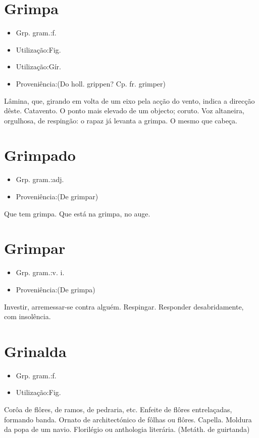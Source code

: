 \section{Grimpa}
\begin{itemize}
\item {Grp. gram.:f.}
\end{itemize}
\begin{itemize}
\item {Utilização:Fig.}
\end{itemize}
\begin{itemize}
\item {Utilização:Gír.}
\end{itemize}
\begin{itemize}
\item {Proveniência:(Do holl. \textunderscore grippen\textunderscore ? Cp. fr. \textunderscore grimper\textunderscore )}
\end{itemize}
Lâmina, que, girando em volta de um eixo pela acção do vento, indica a direcção dêste.
Catavento.
O ponto mais elevado de um objecto; coruto.
Voz altaneira, orgulhosa, de respingão: \textunderscore o rapaz já levanta a grimpa\textunderscore .
O mesmo que \textunderscore cabeça\textunderscore .
\section{Grimpado}
\begin{itemize}
\item {Grp. gram.:adj.}
\end{itemize}
\begin{itemize}
\item {Proveniência:(De \textunderscore grimpar\textunderscore )}
\end{itemize}
Que tem grimpa.
Que está na grimpa, no auge.
\section{Grimpar}
\begin{itemize}
\item {Grp. gram.:v. i.}
\end{itemize}
\begin{itemize}
\item {Proveniência:(De \textunderscore grimpa\textunderscore )}
\end{itemize}
Investir, arremessar-se contra alguém.
Respingar.
Responder desabridamente, com insolência.
\section{Grinalda}
\begin{itemize}
\item {Grp. gram.:f.}
\end{itemize}
\begin{itemize}
\item {Utilização:Fig.}
\end{itemize}
Corôa de flôres, de ramos, de pedraria, etc.
Enfeite de flôres entrelaçadas, formando banda.
Ornato de architectónico de fôlhas ou flôres.
Capella.
Moldura da popa de um navio.
Florilégio ou anthologia literária.
(Metáth. de \textunderscore guirtanda\textunderscore )
